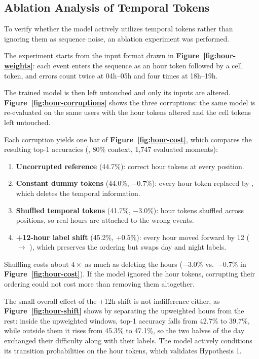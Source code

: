 \subsection{Ablation Analysis of Temporal Tokens}

To verify whether the model actively utilizes temporal tokens rather than ignoring them as sequence noise, an ablation experiment was performed.

The experiment starts from the input format drawn in \textbf{Figure~\ref{fig:hour-weights}}: each event enters the sequence as an hour token followed by a cell token, and errors count twice at 04h--05h and four times at 18h--19h.



The trained model is then left untouched and only its inputs are altered. \textbf{Figure~\ref{fig:hour-corruptions}} shows the three corruptions: the same model is re-evaluated on the same users with the hour tokens altered and the cell tokens left untouched.



Each corruption yields one bar of \textbf{Figure~\ref{fig:hour-cost}}, which compares the resulting top-1 accuracies (\Dmob{}, 80\% context, 1,747 evaluated moments):
\begin{enumerate}
  \item \textbf{Uncorrupted reference} (44.7\%): correct hour tokens at every position.
  \item \textbf{Constant dummy tokens} (44.0\%, $-0.7\%$): every hour token replaced by , which deletes the temporal information.
  \item \textbf{Shuffled temporal tokens} (41.7\%, $-3.0\%$): hour tokens shuffled across positions, so real hours are attached to the wrong events.
  \item \textbf{+12-hour label shift} (45.2\%, $+0.5\%$): every hour moved forward by 12 ( $\rightarrow$ ), which preserves the ordering but swaps day and night labels.
\end{enumerate}



Shuffling costs about $4\times$ as much as deleting the hours ($-3.0\%$ vs.\ $-0.7\%$ in \textbf{Figure~\ref{fig:hour-cost}}). If the model ignored the hour tokens, corrupting their ordering could not cost more than removing them altogether.

The small overall effect of the +12h shift is not indifference either, as \textbf{Figure~\ref{fig:hour-shift}} shows by separating the upweighted hours from the rest: inside the upweighted windows, top-1 accuracy falls from 42.7\% to 39.7\%, while outside them it rises from 45.3\% to 47.1\%, so the two halves of the day exchanged their difficulty along with their labels. The model actively conditions its transition probabilities on the hour tokens, which validates Hypothesis 1.

